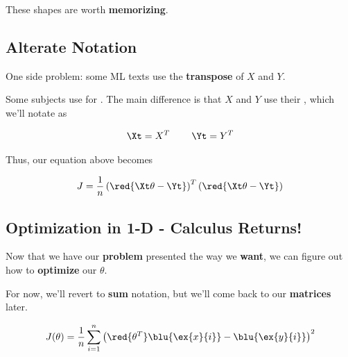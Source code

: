         
        These shapes are worth \textbf{memorizing}.
        
    \subsection{Alterate Notation}
    
        One side problem: some ML texts use the \textbf{transpose} of $X$ and $Y$.\\
    
        \begin{notation}
            Some subjects use  for . The main difference is that $X$ and $Y$ use their , which we'll notate as
        
            \begin{equation*}
                \Xt = X^T \;\;\;\;\;\;\;\; \Yt = Y^T
            \end{equation*}
            
            Thus, our equation above becomes
            
            \begin{equation*}
                J = \frac{1}{n}
                    \left( \red{ \Xt \theta  - \Yt } \right)^T
                    \left( \red{ \Xt \theta  - \Yt } \right) 
            \end{equation*}
        \end{notation}
        
    \subsection{Optimization in 1-D - Calculus Returns!}
    
        Now that we have our \textbf{problem} presented the way we \textbf{want}, we can figure out how to \textbf{optimize} our $\theta$.
        
        For now, we'll revert to \textbf{sum} notation, but we'll come back to our \textbf{matrices} later.
        
        \begin{equation}
            J(\theta) = 
            \frac{1}{n}  \sum_{i=1}^n 
            \left( \red{\theta^T} \blu{\ex{x}{i}}  
            - \blu{\ex{y}{i}} \right)^2 
        \end{equation}
        
